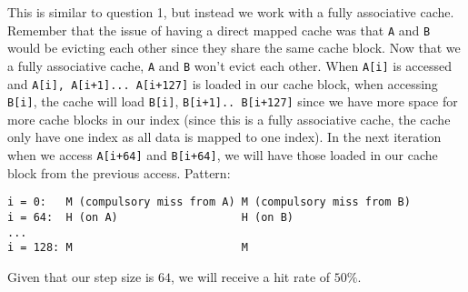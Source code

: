 \begin{blocksection}
\begin{parts}
\begin{solution}[0.7in]
This is similar to question 1, but instead we work with a fully associative cache. Remember that the issue of having a direct mapped cache was that \lstinline$A$ and \lstinline$B$ would be evicting each other since they share the same cache block. Now that we a fully associative cache, \lstinline$A$ and \lstinline$B$ won’t evict each other. When \lstinline$A[i]$ is accessed and \lstinline$A[i], A[i+1]... A[i+127]$ is loaded in our cache block, when accessing \lstinline$B[i]$, the cache will load \lstinline$B[i]$, \lstinline$B[i+1].. B[i+127]$ since we have more space for more cache blocks in our index (since this is a fully associative cache, the cache only have one index as all data is mapped to one index). In the next iteration when we access \lstinline$A[i+64]$ and \lstinline$B[i+64]$, we will have those loaded in our cache block from the previous access.
Pattern: 
\begin{verbatim}
i = 0:   M (compulsory miss from A) M (compulsory miss from B)
i = 64:  H (on A)                   H (on B)
...
i = 128: M                          M
\end{verbatim}
Given that our step size is $64$, we will receive a hit rate of $50\%$.
\end{solution}

\end{parts}

\end{blocksection}